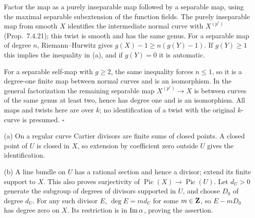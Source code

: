 \documentclass[11pt]{article}
\let\chapterexercise\exercise
\renewcommand{\exercise}[2]{\Needspace{8\baselineskip}\chapterexercise{#1}{#2}}
\begin{document}
\pf
Factor the map as a purely inseparable map followed by a separable map, using the maximal separable subextension of the function fields. The purely inseparable map from smooth $X$ identifies the intermediate normal curve with $X^{(p^r)}$ (Prop.~7.4.21); this twist is smooth and has the same genus. For a separable map of degree $n$, Riemann--Hurwitz gives $g(X)-1\ge n(g(Y)-1)$. If $g(Y)\ge1$ this implies the inequality in (a), and if $g(Y)=0$ it is automatic.

For a separable self-map with $g\ge2$, the same inequality forces $n\le1$, so it is a degree-one finite map between normal curves and is an isomorphism. In the general factorization the remaining separable map $X^{(p^r)}\to X$ is between curves of the same genus at least two, hence has degree one and is an isomorphism. All maps and twists here are over $k$; no identification of a twist with the original $k$-curve is presumed. \hfill$\square$

\pf
(a) On a regular curve Cartier divisors are finite sums of closed points. A closed point of $U$ is closed in $X$, so extension by coefficient zero outside $U$ gives the identification.

(b) A line bundle on $U$ has a rational section and hence a divisor; extend its finite support to $X$. This also proves surjectivity of $\operatorname{Pic}(X)\to\operatorname{Pic}(U)$. Let $d_U>0$ generate the subgroup of degrees of divisors supported in $U$, and choose $D_0$ of degree $d_U$. For any such divisor $E$, $\deg E=md_U$ for some $m\in\mathbf Z$, so $E-mD_0$ has degree zero on $X$. Its restriction is in $\operatorname{Im}\alpha$, proving the assertion.
\end{document}
